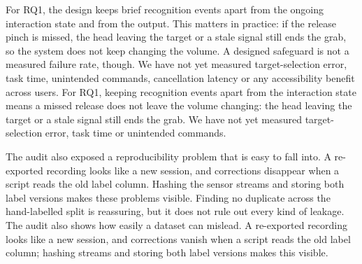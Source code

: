 
\label{discussion}

\iffull
{}\label{what-the-implemented-system-establishes}
\fi

\iffull
For RQ1, the design keeps brief recognition events apart from the ongoing interaction state and from the output. This matters in practice: if the release pinch is missed, the head leaving the target or a stale signal still ends the grab, so the system does not keep changing the volume. A designed safeguard is not a measured failure rate, though. We have not yet measured target-selection error, task time, unintended commands, cancellation latency or any accessibility benefit across users.
\else
For RQ1, keeping recognition events apart from the interaction state means a missed release does not leave the volume changing: the head leaving the target or a stale signal still ends the grab. We have not yet measured target-selection error, task time or unintended commands.
\fi

\iffull
The audit also exposed a reproducibility problem that is easy to fall into. A re-exported recording looks like a new session, and corrections disappear when a script reads the old label column. Hashing the sensor streams and storing both label versions makes these problems visible. Finding no duplicate across the hand-labelled split is reassuring, but it does not rule out every kind of leakage.
\else
The audit also shows how easily a dataset can mislead. A re-exported recording looks like a new session, and corrections vanish when a script reads the old label column; hashing streams and storing both label versions makes this visible.
\fi

\iffull
{}\label{offline-to-live-gap}
\fi

